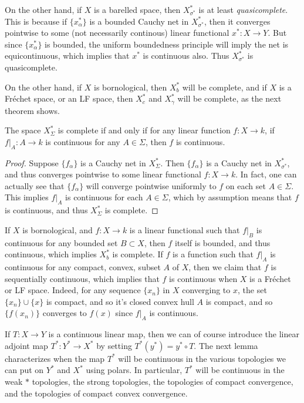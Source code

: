 On the other hand, if $X$ is a barelled space, then $X^*_{\sigma^*}$ is at least \emph{quasicomplete}. This is because if $\{ x_\alpha^* \}$ is a bounded Cauchy net in $X^*_{\sigma^*}$, then it converges pointwise to some (not necessarily continous) linear functional $x^*: X \to Y$. But since $\{ x_\alpha^* \}$ is bounded, the uniform boundedness principle will imply the net is equicontinuous, which implies that $x^*$ is continuous also. Thus $X^*_{\sigma^*}$ is quasicomplete.

On the other hand, if $X$ is bornological, then $X^*_b$ will be complete, and if $X$ is a Fr\'{e}chet space, or an LF space, then $X^*_c$ and $X^*_\gamma$ will be complete, as the next theorem shows.

\begin{theorem}
    The space $X^*_\Sigma$ is complete if and only if for any linear function $f: X \to k$, if $f|_A: A \to k$ is continuous for any $A \in \Sigma$, then $f$ is continuous.
\end{theorem}
\begin{proof}
    Suppose $\{ f_\alpha \}$ is a Cauchy net in $X^*_\Sigma$. Then $\{ f_\alpha \}$ is a Cauchy net in $X^*_{\sigma^*}$, and thus converges pointwise to some linear functional $f: X \to k$. In fact, one can actually see that $\{ f_\alpha \}$ will converge pointwise uniformly to $f$ on each set $A \in \Sigma$. This implies $f|_A$ is continuous for each $A \in \Sigma$, which by assumption means that $f$ is continuous, and thus $X^*_\Sigma$ is complete.
\end{proof}

If $X$ is bornological, and $f: X \to k$ is a linear functional such that $f|_B$ is continuous for any bounded set $B \subset X$, then $f$ itself is bounded, and thus continuous, which implies $X^*_b$ is complete. If $f$ is a function such that $f|_A$ is continuous for any compact, convex, subset $A$ of $X$, then we claim that $f$ is sequentially continuous, which implies that $f$ is continuous when $X$ is a Fr\'{e}chet or LF space. Indeed, for any sequence $\{ x_n \}$ in $X$ converging to $x$, the set $\{ x_n \} \cup \{ x \}$ is compact, and so it's closed convex hull $A$ is compact, and so $\{ f(x_n) \}$ converges to $f(x)$ since $f|_A$ is continuous.

If $T: X \to Y$ is a continuous linear map, then we can of course introduce the linear adjoint map $T^*: Y^* \to X^*$ by setting $T^*(y^*) = y^* \circ T$. The next lemma characterizes when the map $T^*$ will be continuous in the various topologies we can put on $Y^*$ and $X^*$ using polars. In particular, $T^*$ will be continuous in the weak $*$ topologies, the strong topologies, the topologies of compact convergence, and the topologies of compact convex convergence.


